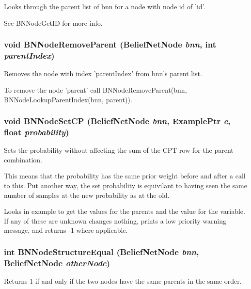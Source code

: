 Looks through the parent list of bnn for a node with node id of 'id'. 

See BNNode\-Get\-ID for more info. 
\subsubsection{\setlength{\rightskip}{0pt plus 5cm}void BNNode\-Remove\-Parent ({\bf Belief\-Net\-Node} {\em bnn}, int {\em parent\-Index})}\label{BeliefNet_8h_a12}


Removes the node with index 'parent\-Index' from bnn's parent list. 

To remove the node 'parent' call BNNode\-Remove\-Parent(bnn, BNNode\-Lookup\-Parent\-Index(bnn, parent)). 
\subsubsection{\setlength{\rightskip}{0pt plus 5cm}void BNNode\-Set\-CP ({\bf Belief\-Net\-Node} {\em bnn}, {\bf Example\-Ptr} {\em e}, float {\em probability})}\label{BeliefNet_8h_a39}


Sets the probability without affecting the sum of the CPT row for the parent combination. 

This means that the probability has the same prior weight before and after a call to this. Put another way, the set probability is equivilant to having seen the same number of samples at the new probability as at the old.

Looks in example to get the values for the parents and the value for the variable. If any of these are unknown changes nothing, prints a low priority warning message, and returns -1 where applicable. 
\subsubsection{\setlength{\rightskip}{0pt plus 5cm}int BNNode\-Structure\-Equal ({\bf Belief\-Net\-Node} {\em bnn}, {\bf Belief\-Net\-Node} {\em other\-Node})}\label{BeliefNet_8h_a24}


Returns 1 if and only if the two nodes have the same parents in the same order. 


